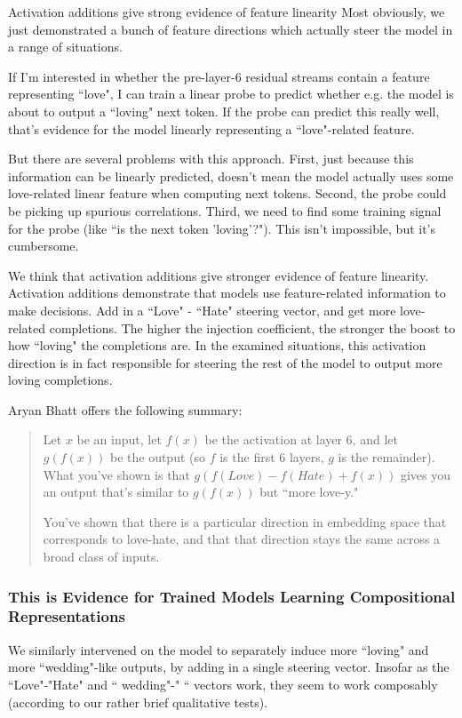 \documentclass[10pt]{article}
\begin{document}
Activation additions give strong evidence of feature linearity
Most obviously, we just demonstrated a bunch of feature directions which actually steer the model in a range of situations. 

If I'm interested in whether the pre-layer-6 residual streams contain a feature representing ``love", I can train a linear probe to predict whether e.g. the model is about to output a ``loving" next token. If the probe can predict this really well, that's evidence for the model linearly representing a ``love"-related feature. 

But there are several problems with this approach. First, just because this information can be linearly predicted, doesn't mean the model actually uses some love-related linear feature when computing next tokens. Second, the probe could be picking up spurious correlations. Third, we need to find some training signal for the probe (like ``is the next token 'loving'?"). This isn't impossible, but it's cumbersome.

We think that activation additions give stronger evidence of feature linearity. Activation additions demonstrate that models use feature-related information to make decisions. Add in a ``Love" - ``Hate" steering vector, and get more love-related completions. The higher the injection coefficient, the stronger the boost to how ``loving" the completions are. In the examined situations, this activation direction is in fact responsible for steering the rest of the model to output more loving completions.

Aryan Bhatt offers the following summary:

\begin{quote}
Let $x$ be an input, let $f(x)$ be the activation at layer 6, and let $g(f(x))$ be the output (so $f$ is the first $6$ layers, $g$ is the remainder). What you've shown is that $g(f(Love)-f(Hate)+f(x))$ gives you an output that's similar to $g(f(x))$ but ``more love-y."

You've shown that there is a particular direction in embedding space that corresponds to love-hate, and that that direction stays the same across a broad class of inputs.
\end{quote}

\subsubsection{This is Evidence for Trained Models Learning Compositional Representations}
We similarly intervened on the model to separately induce more ``loving" and more ``wedding"-like outputs, by adding in a single steering vector. Insofar as the ``Love"-"Hate" and `` wedding"-" `` vectors work, they seem to work composably (according to our rather brief qualitative tests). 
\end{document}
